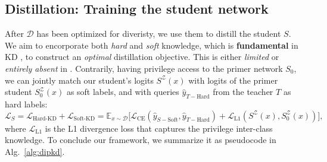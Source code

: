 \subsection{Distillation: Training the student network} \label{ssec:03-framework-distillation}
\begin{foldable}
    After $\mathcal{D}$ has been optimized for diveristy, we use them to distill the student $S$.
    We aim to encorporate both \textit{hard} and \textit{soft} knowledge, which is \textbf{fundamental} in KD \citep{hinton2015distilling}, to construct an \textit{optimal} distillation objective.
    This is either \textit{limited} or \textit{entirely absent} in \citet{wang2021zero, zhang2022ideal, yuan2024data}.
    Contrarily, having privilege access to the primer network $S_0$, we can jointly match our student's logits $S^{\mathcal{Z}}\left(x\right)$ with logits of the primer student $S_{0}^{\mathcal{Z}}\left(x\right)$ as soft labels, and with queries $\hat{y}_{T-\text{Hard}}$ from the teacher $T$ as hard labels:
    \begin{equation} \label{eq:loss-kd-total}
            \mathcal{L}_{S}
            = \mathcal{L}_{\text{Hard-KD}}+\mathcal{L}_{\text{Soft-KD}}
            = \mathbb{E}_{x\sim\mathcal{D}}\Big[\mathcal{L}_{\text{CE}}\left(\hat{y}_{S-\text{Soft}},\hat{y}_{T-\text{Hard}}\right) + \mathcal{L}_{\text{L1}}\left(S^{\mathcal{Z}}\left(x\right),S_{0}^{\mathcal{Z}}\left(x\right)\right)\Big],
    \end{equation}
    where $\mathcal{L}_{\text{L1}}$ is the L1 divergence loss that captures the privilege inter-class knowledge.
    To conclude our framework, we summarize it as pseudocode in Alg.~\ref{alg:dipkd}.
\end{foldable}

